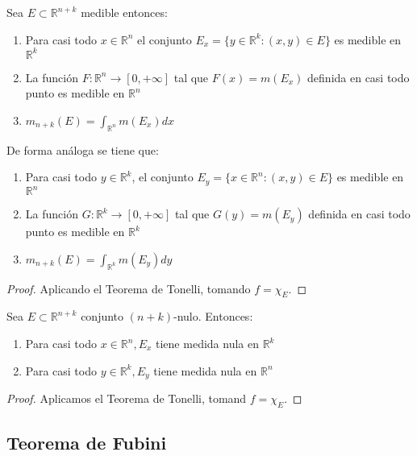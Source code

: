 \begin{corolario}
    Sea $E \subset \mathbb{R}^{n+k}$ medible entonces:
    \vspace{-0.5em}
    \begin{enumerate}
        \item Para casi todo $x \in \mathbb{R}^n$ el conjunto $E_x = \{ y \in \mathbb{R}^k :
                  (x, y) \in E \}$ es medible en $\mathbb{R}^k$
        \item La función $F: \mathbb{R}^n \to [0, +\infty]$ tal que $F(x) = m(E_x)$ definida
              en casi todo punto es medible en $\mathbb{R}^n$
        \item $m_{n+k}(E) = \int_{\mathbb{R}^n}m(E_x)dx$
    \end{enumerate}
    De forma análoga se tiene que:
    \vspace{-0.5em}
    \begin{enumerate}
        \item Para casi todo $y \in \mathbb{R}^k$, el conjunto $E_y = \{ x \in \mathbb{R}^n :
                  (x, y) \in E \}$ es medible en $\mathbb{R}^n$
        \item La función $G: \mathbb{R}^k \to [0, +\infty]$ tal que $G(y) = m(E_y)$ definida
              en casi todo punto es medible en $\mathbb{R}^k$
        \item $m_{n+k}(E) = \int_{\mathbb{R}^k}m(E_y)dy$
    \end{enumerate}
\end{corolario}
\begin{proof}
    Aplicando el Teorema de Tonelli, tomando $f = \chi_E$.
\end{proof}
\begin{corolario}
    Sea $E \subset \mathbb{R}^{n+k}$ conjunto $(n+k)$-nulo. Entonces:
    \vspace{-0.5em}
    \begin{enumerate}
        \item Para casi todo $x \in \mathbb{R}^n, E_x$ tiene medida nula en $\mathbb{R}^k$
        \item Para casi todo $y \in \mathbb{R}^k, E_y$ tiene medida nula en $\mathbb{R}^n$
    \end{enumerate}
\end{corolario}
\begin{proof}
    Aplicamos el Teorema de Tonelli, tomand $f = \chi_E$.
\end{proof}

\subsection{Teorema de Fubini}

